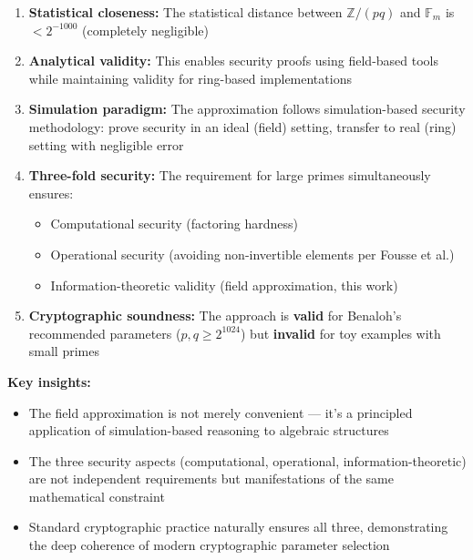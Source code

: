 \documentclass[11pt]{article}
\theoremstyle{definition}
\begin{document}
\begin{enumerate}
\item \textbf{Statistical closeness:} The statistical distance between $\mathbb{Z}/(pq)$ 
  and $\mathbb{F}_m$ is $< 2^{-1000}$ (completely negligible)

\item \textbf{Analytical validity:} This enables security proofs using field-based tools 
  while maintaining validity for ring-based implementations

\item \textbf{Simulation paradigm:} The approximation follows simulation-based security 
  methodology: prove security in an ideal (field) setting, transfer to real (ring) 
  setting with negligible error

\item \textbf{Three-fold security:} The requirement for large primes simultaneously 
  ensures:
  \begin{itemize}
  \item Computational security (factoring hardness)
  \item Operational security (avoiding non-invertible elements per Fousse et al.)
  \item Information-theoretic validity (field approximation, this work)
  \end{itemize}

\item \textbf{Cryptographic soundness:} The approach is \textbf{valid} for Benaloh's 
  recommended parameters ($p, q \geq 2^{1024}$) but \textbf{invalid} for toy examples 
  with small primes
\end{enumerate}

\textbf{Key insights:} 
\begin{itemize}
\item The field approximation is not merely convenient --- it's a principled application 
  of simulation-based reasoning to algebraic structures

\item The three security aspects (computational, operational, information-theoretic) are 
  not independent requirements but manifestations of the same mathematical constraint

\item Standard cryptographic practice naturally ensures all three, demonstrating the 
  deep coherence of modern cryptographic parameter selection
\end{itemize}
\end{document}
